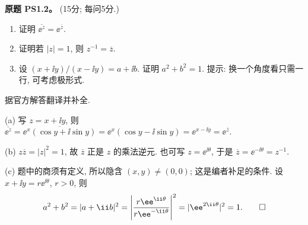 \begin{exercise}\label{ass:ps1-2}
\textbf{原题 PS1.2。} (15分; 每问5分.)
\begin{enumerate}[label=(\alph*)]
\item 证明 $\overline{\ee^z}=\ee^{\overline z}$.
\item 证明若 $|z|=1$, 则 $z^{-1}=\overline z$.
\item 设 $(x+\ii y)/(x-\ii y)=a+\ii b$. 证明 $a^2+b^2=1$.
提示: 换一个角度看只需一行, 可考虑极形式.
\end{enumerate}
\end{exercise}
\begin{solution}
据官方解答翻译并补全.

(a) 写 $z=x+\ii y$, 则
$\overline{\ee^z}=\overline{\ee^x(\cos y+\ii\sin y)}
=\ee^x(\cos y-\ii\sin y)=\ee^{x-\ii y}=\ee^{\overline z}$.

(b) $z\overline z=|z|^2=1$, 故 $\overline z$ 正是 $z$ 的乘法逆元.
也可写 $z=\ee^{\ii\theta}$, 于是 $\overline z=\ee^{-\ii\theta}=z^{-1}$.

(c) 题中的商须有定义, 所以隐含 $(x,y)\ne(0,0)$; 这是编者补足的条件. 设 $x+\ii y=r\ee^{\ii\theta}$, $r>0$, 则
\[
 a^2+b^2=|a+\ii b|^2
 =\left|\frac{r\ee^{\ii\theta}}{r\ee^{-\ii\theta}}\right|^2
 =|\ee^{2\ii\theta}|^2=1.\qedhere
\]
\end{solution}

